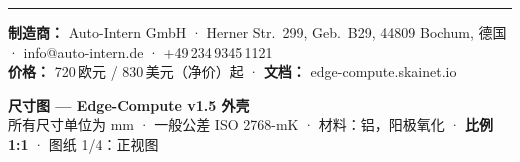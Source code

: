 \documentclass[10pt,a4paper]{article}
\begin{document}
\vspace{2mm}\hrule\vspace{1.5mm}
{\small
\textbf{制造商：} Auto-Intern GmbH · Herner Str.\ 299, Geb.\ B29, 44809 Bochum, 德国 · info@auto-intern.de · +49\,234\,9345\,1121\\
\textbf{价格：} 720\,欧元 / 830\,美元（净价）起 · \textbf{文档：} edge-compute.skainet.io}

\newpage
\thispagestyle{fancy}
\begin{center}
{\large\textbf{尺寸图 — Edge-Compute v1.5 外壳}}\\[1mm]
{\small 所有尺寸单位为 mm · 一般公差 ISO 2768-mK · 材料：铝，阳极氧化 · \textbf{比例 1:1} · 图纸 1/4：正视图}
\end{center}
\vfill
\end{document}
